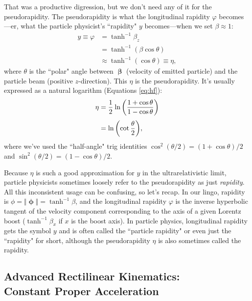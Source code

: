 \documentclass[12pt]{article}
\newcommand{\vvbeta}{\bm{\upbeta}}
\begin{document}
That was a productive digression, but we don't need any of it for the pseudorapidity. The pseudorapidity is what the longitudinal rapidity $\varphi$ becomes---er, what the particle physicist's ``rapidity" $y$ becomes---when we set $\beta \approx 1$:
\begin{equation*}
\begin{aligned}
y \equiv \varphi &= \tanh^{-1} \beta_z \\
&= \tanh^{-1} ( \beta \cos{\theta} ) \\
& \approx  \tanh^{-1} ( \cos{\theta} ) \equiv \eta ,
\end{aligned}
\end{equation*}
where $\theta$ is the ``polar" angle between $\vvbeta$ (velocity of emitted particle) and the particle beam (positive $z$-direction). This $\eta$ is the pseudorapidity. It's usually expressed as a natural logarithm (Equations \ref{eq:hf}):
\begin{equation*}
\begin{split}
\eta &= \dfrac{1}{2} \mkern1mu \ln{ \left( \dfrac{1 + \cos{\theta}}{1 - \cos{\theta}} \right) } \\[3pt]
&= \ln{ \left( \cot {\dfrac{\theta}{2}} \right) },
\end{split}
\end{equation*}
where we've used the ``half-angle" trig identities $\cos^2{(\theta / 2)} = (1 + \cos{\theta})/2$ and $\sin^2{(\theta / 2)} = (1 - \cos{\theta})/2$.

Because $\eta$ is such a good approximation for $y$ in the ultrarelativistic limit, particle physicists sometimes loosely refer to the pseudorapidity as just \emph{rapidity}. All this inconsistent usage can be confusing, so let's recap. In our lingo, rapidity is $\phi = \Vert \bm{\upphi} \Vert = \tanh^{-1}{\beta}$, and the longitudinal rapidity $\varphi$ is the inverse hyperbolic tangent of the velocity component corresponding to the axis of a given Lorentz boost ($\tanh^{-1}{\beta_x}$ if $x$ is the boost axis). In particle physics, longitudinal rapidity gets the symbol $y$ and is often called the ``particle rapidity" or even just the ``rapidity" for short, although the pseudorapidity $\eta$ is also sometimes called the rapidity.


\subsection[Advanced Rectilinear Kinematics: Constant Proper Acceleration]{Advanced Rectilinear Kinematics:\\ Constant Proper Acceleration}\label{ssec:ak}
\end{document}
